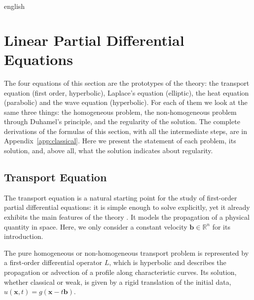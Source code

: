 \begin{hyphenrules}{english}
\section{Linear Partial Differential Equations}\label{sec:linear-pdes}

The four equations of this section are the prototypes of the theory: the transport equation (first
order, hyperbolic), Laplace's equation (elliptic), the heat equation (parabolic) and the wave equation
(hyperbolic). For each of them we look at the same three things: the homogeneous problem, the
non-homogeneous problem through Duhamel's principle, and the regularity of the solution.
The complete derivations of the formulas of this section, with all the intermediate steps, are in
Appendix~\ref{app:classical}. Here we present the statement of each problem, its solution, and, above all, 
what the solution indicates about regularity.

\subsection{Transport Equation}\label{subsec:transport}

The transport equation is a natural starting point for the study of first-order partial differential
equations: it is simple enough to solve explicitly, yet it already exhibits the main features of the
theory \cite{evans2010}. It models the propagation of a physical quantity in space. Here, we only
consider a constant velocity $\mathbf{b}\in\mathbb{R}^n$ for its introduction.

The pure homogeneous or non-homogeneous transport problem is represented by a first-order differential
operator $L$, which is hyperbolic and describes the propagation or advection of a profile along
characteristic curves. Its solution, whether classical or weak, is given by a rigid translation of the
initial data, $u(\mathbf{x},t)=g(\mathbf{x}-t\mathbf{b})$.


\end{hyphenrules}
